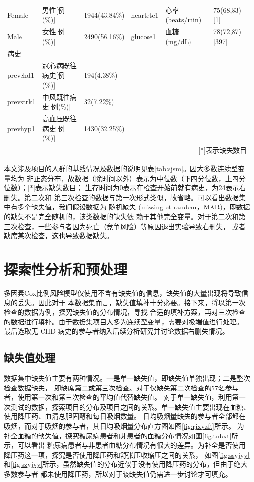\documentclass[lang=cn,11pt,a4paper,cite=super,AutoFakeBold]{elegantpaper}
\begin{document}
\begin{table}[htb]
{\begin{tabular}{lll||lll}
   Female   & 男性[例(\%)]      & 1944(43.84\%) & heartrte1 & 心率(beats/min)   & 75(68,83)[1]            \\
   Male     & 女性[例(\%)]      & 2490(56.16\%) & glucose1  & 血糖(mg/dL)~      & 78(72,87)[397]          \\
   病史       &  & &           &   &           \\
   prevchd1 & 冠心病既往病史[例(\%)] & 194(4.38\%)   &           &   &           \\
   prevstrk1& 中风既往病史[例(\%)] & 32(7.22\%)   &           &   &           \\
   prevhyp1 & 高血压既往病史[例(\%)] & 1430(32.25\%) &           &   &           \\
   \bottomrule
   \multicolumn{6}{r}{\small{[*]表示缺失数目}}\\
   \end{tabular}}
\end{table}

本文涉及项目的人群的基线情况及数据的说明见表\ref{tab:sjsm}。因大多数连续型变量均为
非正态分布，故数据（除时间以外）表示为中位数（下四分位数，上四分位数）；[*]表示缺失数目；
生存时间为0表示在检查开始前就有病史，为24表示右删失。第二次和
第三次检查的数据与第一次形式类似，故省略。可以看出数据集中有多个缺失值，我们假设数据为
随机缺失 (missing at random，MAR)，即数据的缺失不是完全随机的，该类数据的缺失依
赖于其他完全变量。对于第二次和第三次检查，一些参与者因为死亡（竞争风险）等原因退出实验导致右删失，
或者缺席某次检查，这也导致数据缺失。

\section{探索性分析和预处理}
多因素Cox比例风险模型仅使用不含有缺失值的信息，缺失值的大量出现将导致信息的丢失。因此对于
本数据集而言，缺失值填补十分必要。接下来，将以第一次检查的数据为例，探究缺失值的分布情况，寻找
合适的填补方案，再对三次检查的数据进行填补。由于数据集项目大多为连续型变量，需要对极端值进行处理。
最后选取无 CHD 病史的参与者纳入后续分析研究并讨论数据右删失情况。
\subsection{缺失值处理}
数据集中缺失值主要有两种情况。一是单一缺失值，即缺失值单独出现；二是整次检查数据缺失，
即缺席第二或第三次检查。对于仅缺失第二次检查的57名参与者，使用第一次和第三次检查的平均值代替缺失值。
对于单一缺失值，利用第一次测试的数据，探索项目的分布及项目之间的关系。单一缺失值主要出现在血糖、
使用降压药、血清总胆固醇和每日吸烟数量。
日均吸烟量缺失的参与者全部都在吸烟，而对于吸烟的参与者，其日均吸烟量分布直方图如图\ref{fig:rjxyzft}所示。
为补全血糖的缺失值，探究糖尿病患者和非患者的血糖分布情况如图\ref{fig:tnbxt}所示，可以看出
糖尿病患者与非患者血糖分布情况有很大的差异。为补全是否使用降压药这一项，探究是否使用降压药和舒张压收缩压之间的关系，
如图\ref{fig:ssyjyy}和\ref{fig:szyjyy}所示，虽然缺失值的分布近似于没有使用降压药的分布，但由于绝大多数参与者
都未使用降压药，所以对于该缺失值仍需进一步讨论才可填充。
\end{document}
